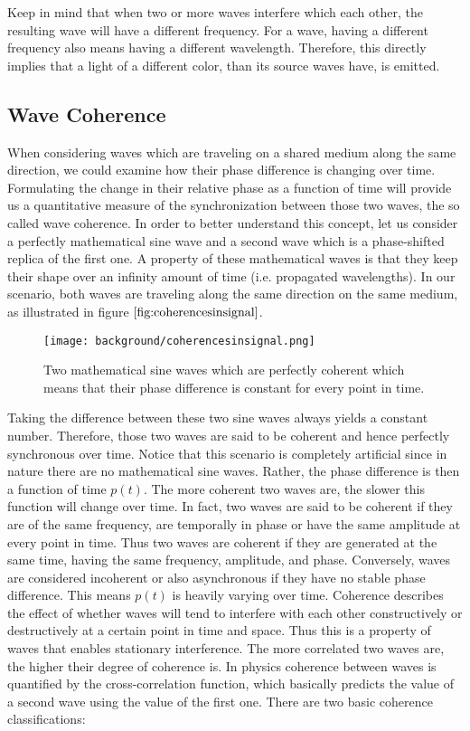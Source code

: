 Keep in mind that when two or more waves interfere which each other, the resulting wave will have a different frequency. For a wave, having a different frequency also means having a different wavelength. Therefore, this directly implies that a light of a different color, than its source waves have, is emitted. 

\subsection{Wave Coherence}
\label{sec:wavecoherence}
When considering waves which are traveling on a shared medium along the same direction, we could examine how their phase difference is changing over time. Formulating the change in their relative phase as a function of time will provide us a quantitative measure of the synchronization between those two waves, the so called wave coherence. In order to better understand this concept, let us consider a perfectly mathematical sine wave and a second wave which is a phase-shifted replica of the first one. A property of these mathematical waves is that they keep their shape over an infinity amount of time (i.e. propagated wavelengths). In our scenario, both waves are traveling along the same direction on the same medium, as illustrated in figure $\ref{fig:coherencesinsignal}$.
\begin{figure}[H]
  \centering
  \texttt{[image: background/coherencesinsignal.png]}
  \caption[Wave Coherence]{Two mathematical sine waves which are perfectly coherent which means that their phase difference is constant for every point in time.}
  \label{fig:coherencesinsignal}
\end{figure}
\noindent
Taking the difference between these two sine waves always yields a constant number. Therefore, those two waves are said to be coherent and hence perfectly synchronous over time. Notice that this scenario is completely artificial since in nature there are no mathematical sine waves. Rather, the phase difference is then a function of time $p(t)$. The more coherent two waves are, the slower this function will change over time. 
In fact, two waves are said to be coherent if they are of the same frequency, are temporally in phase or have the same amplitude at every point in time. Thus two waves are coherent if they are generated at the same time, having the same frequency, amplitude, and phase. Conversely, waves are considered incoherent or also asynchronous if they have no stable phase difference. This means $p(t)$ is heavily varying over time. Coherence describes the effect of whether waves will tend to interfere with each other constructively or destructively at a certain point in time and space. Thus this is a property of waves that enables stationary interference. The more correlated two waves are, the higher their degree of coherence is. In physics coherence between waves is quantified by the cross-correlation function, which basically predicts the value of a second wave using the value of the first one. There are two basic coherence classifications:

